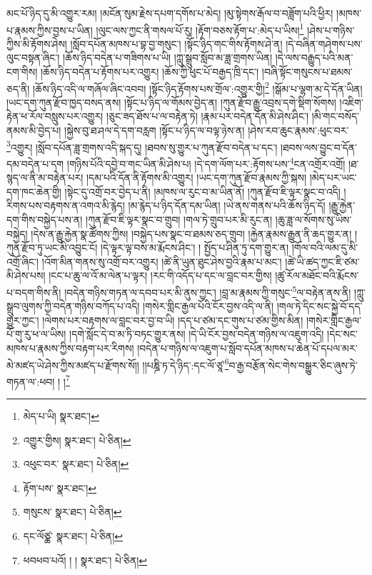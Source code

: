 མང་པོ་ཉིད་དུ་མི་འགྱུར་རམ། །མངོན་སུམ་རྗེས་དཔག་དགོས་པ་མེད། །མུ་སྟེགས་རྒོལ་བ་བཟློག་པའི་ཕྱིར། །མཁས་པ་རྣམས་ཀྱིས་བྱས་པ་ཡིན། །ལུང་ལས་ཀྱང་ནི་གསལ་པོ་རུ། །རྟོག་བཅས་རྟོག་པ་:མེད་པ་ཡིས།\footnote{མེད་པ་ཡི།  སྣར་ཐང་། } །ཤེས་པ་གཉིས་ཀྱིས་མི་རྟོགས་ཤེས། །སློབ་དཔོན་མཁས་པ་བྷ་བྱ་གསུང་། །སྟོང་ཉིད་གང་གིས་རྟོགས་ཤེ་ན། །དེ་བཞིན་གཤེགས་པས་ལུང་བསྟན་ཞིང་། །ཆོས་ཉིད་བདེན་པ་གཟིགས་པ་ཡི། །ཀླུ་སྒྲུབ་སློབ་མ་ཟླ་གྲགས་ཡིན། །དེ་ལས་བརྒྱུད་པའི་མན་ངག་གིས། །ཆོས་ཉིད་བདེན་པ་རྟོགས་པར་འགྱུར། །ཆོས་ཀྱི་ཕུང་པོ་བརྒྱད་ཁྲི་དང་། །བཞི་སྟོང་གསུངས་པ་ཐམས་ཅད་ནི། །ཆོས་ཉིད་འདི་ལ་གཞོལ་ཞིང་འབབ། །སྟོང་ཉིད་རྟོགས་པས་གྲོལ་:འགྱུར་གྱི།\footnote{འགྱུར་གྱིས།  སྣར་ཐང་།  པེ་ཅིན། } །སྒོམ་པ་ལྷག་མ་དེ་དོན་ཡིན། །ཡང་དག་ཀུན་རྫོབ་ཁྱད་བསད་ནས། །སྟོང་པ་ཉིད་ལ་གོམས་བྱེད་ན། །ཀུན་རྫོབ་རྒྱུ་འབྲས་དགེ་སྡིག་སོགས། །འཇིག་རྟེན་ཕ་རོལ་བསླུས་པར་འགྱུར། །ཅུང་ཟད་ཐོས་པ་ལ་བརྟེན་ཏེ། །རྣམ་པར་བདེན་དོན་མི་ཤེས་ཤིང་། །མི་གང་བསོད་ནམས་མི་བྱེད་པ། །སྐྱེས་བུ་ཐ་ཤལ་དེ་དག་བརླག །སྟོང་པ་ཉིད་ལ་བལྟ་ཉེས་ན། །ཤེས་རབ་ཆུང་རྣམས་:ཕུང་བར་\footnote{འཕུང་བར་  སྣར་ཐང་།  པེ་ཅིན། }འགྱུར། །སློབ་དཔོན་ཟླ་གྲགས་འདི་སྐད་དུ། །ཐབས་སུ་གྱུར་པ་ཀུན་རྫོབ་བདེན་པ་དང་། །ཐབས་ལས་བྱུང་བ་དོན་དམ་བདེན་པ་དག །གཉིས་པོའི་དབྱེ་བ་གང་ཡིན་མི་ཤེས་པ། །དེ་དག་ལོག་པར་:རྟོགས་པས་\footnote{རྟོག་པས་  སྣར་ཐང་། }ངན་འགྲོར་འགྲོ། །ཐ་སྙད་ལ་ནི་མ་བརྟེན་པར། །དམ་པའི་དོན་ནི་རྟོགས་མི་འགྱུར། །ཡང་དག་ཀུན་རྫོབ་རྣམས་ཀྱི་སྐས། །མེད་པར་ཡང་དག་ཁང་ཆེན་གྱི། །སྟེང་དུ་འགྲོ་བར་བྱེད་པ་ནི། །མཁས་ལ་རུང་བ་མ་ཡིན་ནོ། །ཀུན་རྫོབ་ཇི་ལྟར་སྣང་བ་འདི། །རིགས་པས་བརྟགས་ན་འགའ་མི་རྙེད། །མ་རྙེད་པ་ཉིད་དོན་དམ་ཡིན། །ཡེ་ནས་གནས་པའི་ཆོས་ཉིད་དོ། །རྒྱུ་རྐྱེན་དག་གིས་བསྐྱེད་པས་ན། །ཀུན་རྫོབ་ཇི་ལྟར་སྣང་བ་གྲུབ། །གལ་ཏེ་གྲུབ་པར་མི་རུང་ན། །ཆུ་ཟླ་ལ་སོགས་སུ་ཡིས་བསྐྱེད། །དེས་ན་རྒྱུ་རྐྱེན་སྣ་ཚོགས་ཀྱིས། །བསྐྱེད་པས་སྣང་བ་ཐམས་ཅད་གྲུབ། །རྐྱེན་རྣམས་རྒྱུན་ནི་ཆད་གྱུར་ན། །ཀུན་རྫོབ་ཏུ་ཡང་མི་འབྱུང་ངོ། །དེ་ལྟར་ལྟ་བས་མ་རྨོངས་ཤིང་། །
སྤྱོད་པ་ཤིན་ཏུ་དག་གྱུར་ན། །གོལ་བའི་ལམ་དུ་མི་འགྲོ་ཞིང་། །འོག་མིན་གནས་སུ་འགྲོ་བར་འགྱུར། །ཚེ་ནི་ཡུན་ཐུང་ཤེས་བྱའི་རྣམ་པ་མང་། །ཚེ་ཡི་ཚད་ཀྱང་ཇི་ཙམ་མི་ཤེས་པས། །ངང་པ་ཆུ་ལ་འོ་མ་ལེན་པ་ལྟར། །རང་གི་འདོད་པ་དང་ལ་བླང་བར་གྱིས། །ཚུ་རོལ་མཐོང་བའི་རྨོངས་པ་བདག་གིས་ནི། །བདེན་གཉིས་གཏན་ལ་དབབ་པར་མི་ནུས་ཀྱང་། །བླ་མ་རྣམས་ཀྱི་གསུང་\footnote{གསུངས་  སྣར་ཐང་།  པེ་ཅིན། }ལ་བརྟེན་ནས་ནི། །ཀླུ་སྒྲུབ་ལུགས་ཀྱི་བདེན་གཉིས་བཀོད་པ་འདི། །གསེར་གླིང་རྒྱལ་པོའི་ངོར་བྱས་འདི་ལ་ནི། །གལ་ཏེ་དིང་སང་སྐྱེ་བོ་དད་གྱུར་ཀྱང་། །ལེགས་པར་བརྟགས་ལ་བླང་བར་བྱ་བ་ཡི། །དད་པ་ཙམ་དང་གུས་པ་ཙམ་གྱིས་མིན། །གསེར་གླིང་རྒྱལ་པོ་གུ་རུ་ཕ་ལ་ཡིས། །དགེ་སློང་དེ་བ་མ་ཏི་བཏང་གྱུར་ནས། །དེ་ཡི་ངོར་བྱས་བདེན་གཉིས་ལ་འཇུག་འདི། །དེང་སང་མཁས་པ་རྣམས་ཀྱིས་བརྟག་པར་རིགས། །བདེན་པ་གཉིས་ལ་འཇུག་པ་སློབ་དཔོན་མཁས་པ་ཆེན་པོ་དཔལ་མར་མེ་མཛད་ཡེ་ཤེས་ཀྱིས་མཛད་པ་རྫོགས་སོ།། །།པཎྜི་ཏ་དེ་ཉིད་:དང་ལོ་ཙཱ་\footnote{དང་ལོཙྪ་  སྣར་ཐང་།  པེ་ཅིན། }བ་རྒྱ་བརྩོན་སེང་གེས་བསྒྱུར་ཅིང་ཞུས་ཏེ་གཏན་ལ་:ཕབ། ། །\footnote{ཕབཕབ་པའོ། ། །  སྣར་ཐང་།  པེ་ཅིན། }